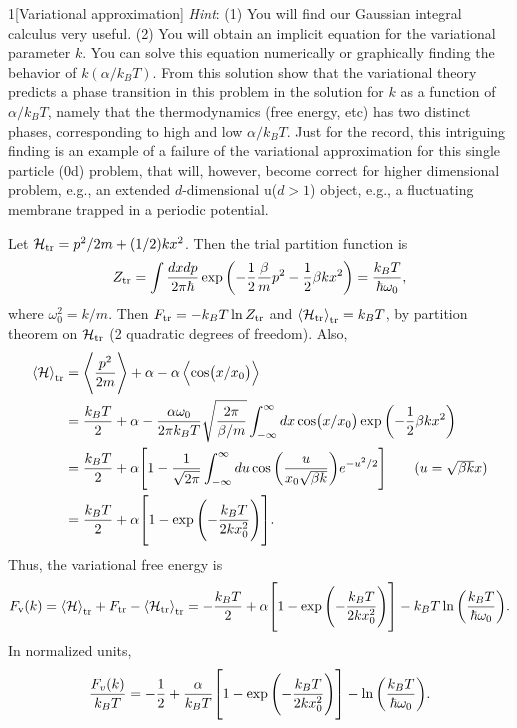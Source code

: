 \documentclass[12pt]{article}
\begin{document}
\begin{problem}{1}[Variational approximation]
\textit{Hint}: (1) You will find our Gaussian integral calculus very useful. (2)
You will obtain an implicit equation for the variational parameter $k$. You can
solve this equation numerically or graphically finding the behavior of
$k(\alpha/k_BT)$. From this solution show that the variational theory predicts a
phase transition in this problem in the solution for $k$ as a function of
$\alpha/k_BT$, namely that the thermodynamics (free energy, etc) has two
distinct phases, corresponding to high and low $\alpha/k_BT$. Just for the
record, this intriguing finding is an example of a failure of the variational
approximation for this single particle (0d) problem, that will, however, become
correct for higher dimensional problem, e.g., an extended $d$-dimensional
u($d>1$) object, e.g., a fluctuating membrane trapped in a periodic potential.
\begin{solution}
Let $\mathcal{H}_{\text{tr}}=p^2/2m+(1/2)kx^2$. Then the trial partition function
is
\begin{equation}
    Z_{\text{tr}}=\int\frac{dxdp}{2\pi\hbar}\exp\qty(-\frac12\frac{\beta}{m}p^2
    -\frac12\beta kx^2)=\frac{k_BT}{\hbar\omega_0},
\end{equation}
where $\omega_0^2=k/m$. Then $F_{\text{tr}}=-k_BT\ln Z_{\text{tr}}$ and
$\expval{\mathcal{H}_{\text{tr}}}_{\text{tr}}=k_BT$, by partition theorem on $\mathcal{H}_{\text{tr}}$ (2
quadratic degrees of freedom). Also,
\begin{align}
    \expval{\HH}_\t{tr}
    &=\expval{\frac{p^2}{2m}}+\alpha-\alpha\expval{\cos(x/x_0)}\notag\\
    &=\frac{k_BT}{2}+\alpha-\frac{\alpha\omega_0}{2\pi k_BT}
    \sqrt{\frac{2\pi}{\beta/m}}\int_{-\infty}^\infty
    dx\cos(x/x_0)\exp\qty(-\frac12\beta kx^2)\notag\\
    &=\frac{k_BT}{2}+\alpha\qty[1-\frac{1}{\sqrt{2\pi}}
    \int_{-\infty}^\infty
        du\cos\qty(\frac{u}{x_0\sqrt{\beta k}})e^{-u^2/2}]
        \tag{$u=\sqrt{\beta k}x$}\\
    &=\frac{k_BT}{2}+\alpha\qty[1-\exp\qty(-\frac{k_BT}{2kx_0^2})].
\end{align}
Thus, the variational free energy is
\begin{align}
    F_{\text{v}}(k)=\expval{\mathcal{H}}_{\text{tr}}+F_{\text{tr}}-\expval{\mathcal{H}_{\text{tr}}}_{\text{tr}}
    =-\frac{k_BT}{2}+\alpha\qty[1-\exp\qty(-\frac{k_BT}{2kx_0^2})]-k_BT\ln\qty(\frac{k_BT}{\hbar\omega_0}).
\end{align}
In normalized units,
\begin{equation}
    \frac{F_v(k)}{k_BT}=-\frac12+\frac{\alpha}{k_BT}\qty[1-\exp\qty(-\frac{k_BT}{2kx_0^2})]-\ln\qty(\frac{k_BT}{\hbar\omega_0}). 

\end{equation}
\end{solution}
\end{problem}
\end{document}
